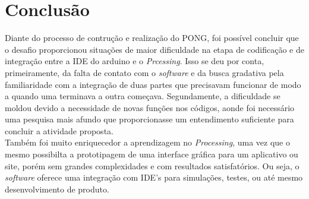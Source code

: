 \documentclass[11pt, a4paper, twocolumn]{article}
\begin{document}
\section{Conclusão}
Diante do processo de contrução e realização do PONG, foi possível concluir que o desafio proporcionou situações de maior dificuldade na etapa de codificação e de integração
entre a IDE do arduino e o \textit{Prcessing}. Isso se deu por conta, primeiramente, da falta de contato com o \textit{software} e da busca gradativa pela familiaridade com a 
integração de duas partes que precisavam funcionar de modo a quando uma terminava a outra começava. Segundamente, a dificuldade se moldou devido a necessidade de novas funções 
nos códigos, aonde foi necessário uma pesquisa mais afundo que proporcionasse um entendimento suficiente para concluir a atividade proposta.
\\
Também foi muito enriquecedor a aprendizagem no \textit{Processing}, uma vez que o mesmo possibilta a prototipagem de uma interface gráfica para um aplicativo ou site, porém sem 
grandes complexidades e com resultados satisfatórios. Ou seja, o \textit{software} oferece uma integração com IDE's para simulações, testes, ou até mesmo desenvolvimento de produto.
\end{document}
